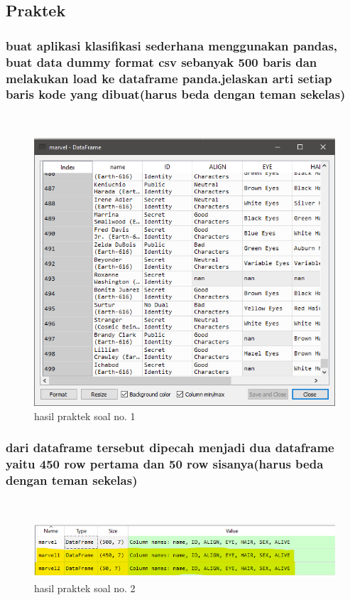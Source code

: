 \subsection{Praktek}
\subsubsection{buat aplikasi klasifikasi sederhana menggunakan pandas, buat data dummy format csv sebanyak 500 baris dan melakukan load ke dataframe panda.jelaskan arti setiap baris kode yang dibuat(harus beda dengan teman sekelas)}
\hfill\\

	\begin{figure}[H]
	\centering
		\includegraphics[width=8 cm]{figures/1174083/figures4/7.png}
	\caption{hasil praktek soal no. 1}
	\end{figure}


\subsubsection{dari dataframe tersebut dipecah menjadi dua dataframe yaitu 450 row pertama dan 50 row sisanya(harus beda dengan teman sekelas)}
\hfill\\

	\begin{figure}[H]
	\centering
		\includegraphics[width=8 cm]{figures/1174083/figures4/8.png}
	\caption{hasil praktek soal no. 2}
	\end{figure}

